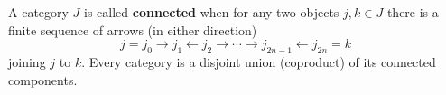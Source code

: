 A category $J$ is called \textbf{connected} when for any two objects $j, k \in J$ there is a finite sequence of arrows (in either direction)
$$j = j_0 \to j_1 \leftarrow j_2 \to \cdots \to j_{2n-1} \leftarrow j_{2n} = k$$
joining $j$ to $k$. Every category is a disjoint union (coproduct) of its connected components.